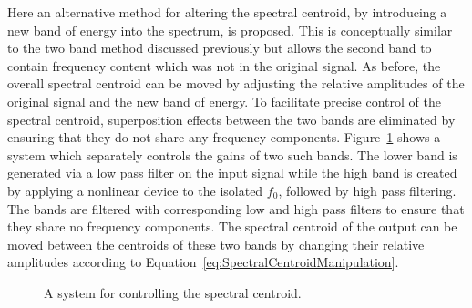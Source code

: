 			Here an alternative method for altering the spectral centroid, by introducing a new band of energy
			into the spectrum, is proposed. This is conceptually similar to the two band method discussed
			previously but allows the second band to contain frequency content which was not in the original
			signal. As before, the overall spectral centroid can be moved by adjusting the relative amplitudes
			of the original signal and the new band of energy. To facilitate precise control of the spectral
			centroid, superposition effects between the two bands are eliminated by ensuring that they do not
			share any frequency components.  Figure~\ref{fig:TwoBandSpectralCentroidSystem} shows a system
			which separately controls the gains of two such bands. The lower band is generated via a low pass
			filter on the input signal while the high band is created by applying a nonlinear device to the
			isolated $f_{0}$, followed by high pass filtering. The bands are filtered with corresponding low
			and high pass filters to ensure that they share no frequency components. The spectral centroid of
			the output can be moved between the centroids of these two bands by changing their relative
			amplitudes according to Equation~\ref{eq:SpectralCentroidManipulation}.

			\begin{figure}[h!]
				\centering
				\caption{A system for controlling the spectral centroid.}
				\label{fig:TwoBandSpectralCentroidSystem}
			\end{figure}

